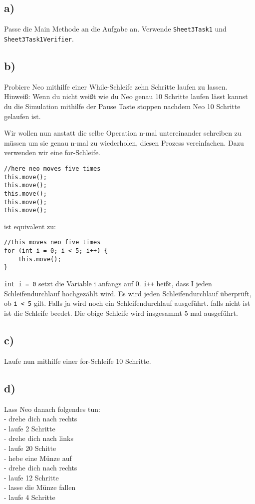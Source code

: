 \subsection*{a)}
	Passe die Main Methode an die Aufgabe an. Verwende \lstinline{Sheet3Task1} und \lstinline{Sheet3Task1Verifier}.
\subsection*{b)}
	Probiere Neo mithilfe einer While-Schleife zehn Schritte laufen zu lassen.\\
	Hinweiß: Wenn du nicht weißt wie du Neo genau 10 Schritte laufen lässt kannst du die Simulation mithilfe der Pause Taste stoppen nachdem Neo 10 Schritte gelaufen ist.

\begin{Infobox}
		Wir wollen nun anstatt die selbe Operation n-mal untereinander schreiben zu müssen um sie genau n-mal zu wiederholen, diesen Prozess vereinfachen.
		Dazu verwenden wir eine for-Schleife. 
		\begin{lstlisting}
//here neo moves five times
this.move();
this.move();
this.move();
this.move();
this.move();
		\end{lstlisting}
		ist equivalent zu:
		\begin{lstlisting}
//this moves neo five times
for (int i = 0; i < 5; i++) {
	this.move();
}
		\end{lstlisting}
 \lstinline{int i = 0} setzt die Variable i anfangs auf 0.  \lstinline{i++} heißt, dass I jeden Schleifendurchlauf hochgezählt wird. Es wird jeden Schleifendurchlauf überprüft, ob  \lstinline{i < 5} gilt. Falls ja wird noch ein Schleifendurchlauf ausgeführt. falls nicht ist ist die Schleife beedet. Die obige Schleife wird insgesammt 5 mal ausgeführt.
 \end{Infobox}

\subsection*{c)}
Laufe nun mithilfe einer for-Schleife 10 Schritte.

\subsection*{d)}
Lass Neo danach folgendes tun:\\
	- drehe dich nach rechts\\
	- laufe 2 Schritte\\
	- drehe dich nach links\\ 
	- laufe 20 Schitte\\
	- hebe eine Münze auf\\
	- drehe dich nach rechts\\
	- laufe 12 Schritte\\
	- lasse die Münze fallen\\
	- laufe 4 Schritte

